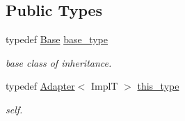 \subsection*{Public Types}
\begin{DoxyCompactItemize}
\item 
\hypertarget{classhryky_1_1memory_1_1heap_1_1_adapter_a69dfccb0d6f7aa6aeef6bd65841a76d9}{typedef \hyperlink{classhryky_1_1memory_1_1heap_1_1_base}{Base} \hyperlink{classhryky_1_1memory_1_1heap_1_1_adapter_a69dfccb0d6f7aa6aeef6bd65841a76d9}{base\-\_\-type}}\label{classhryky_1_1memory_1_1heap_1_1_adapter_a69dfccb0d6f7aa6aeef6bd65841a76d9}

\begin{DoxyCompactList}\small\item\em base class of inheritance. \end{DoxyCompactList}\item 
\hypertarget{classhryky_1_1memory_1_1heap_1_1_adapter_a9087ede8b831771da3798c41cfb8b8e7}{typedef \hyperlink{classhryky_1_1memory_1_1heap_1_1_adapter}{Adapter}$<$ Impl\-T $>$ \hyperlink{classhryky_1_1memory_1_1heap_1_1_adapter_a9087ede8b831771da3798c41cfb8b8e7}{this\-\_\-type}}\label{classhryky_1_1memory_1_1heap_1_1_adapter_a9087ede8b831771da3798c41cfb8b8e7}

\begin{DoxyCompactList}\small\item\em self. \end{DoxyCompactList}\end{DoxyCompactItemize}
